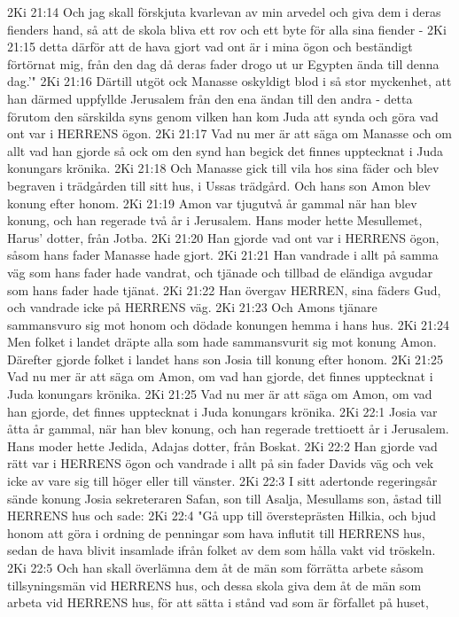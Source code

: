 2Ki 21:14  Och jag skall förskjuta kvarlevan av min arvedel och giva dem i deras fienders hand, så att de skola bliva ett rov och ett byte för alla sina fiender -
2Ki 21:15  detta därför att de hava gjort vad ont är i mina ögon och beständigt förtörnat mig, från den dag då deras fader drogo ut ur Egypten ända till denna dag.'"
2Ki 21:16  Därtill utgöt ock Manasse oskyldigt blod i så stor myckenhet, att han därmed uppfyllde Jerusalem från den ena ändan till den andra - detta förutom den särskilda syns genom vilken han kom Juda att synda och göra vad ont var i HERRENS ögon.
2Ki 21:17  Vad nu mer är att säga om Manasse och om allt vad han gjorde så ock om den synd han begick det finnes upptecknat i Juda konungars krönika.
2Ki 21:18  Och Manasse gick till vila hos sina fäder och blev begraven i trädgården till sitt hus, i Ussas trädgård. Och hans son Amon blev konung efter honom.
2Ki 21:19  Amon var tjugutvå år gammal när han blev konung, och han regerade två år i Jerusalem. Hans moder hette Mesullemet, Harus' dotter, från Jotba.
2Ki 21:20  Han gjorde vad ont var i HERRENS ögon, såsom hans fader Manasse hade gjort.
2Ki 21:21  Han vandrade i allt på samma väg som hans fader hade vandrat, och tjänade och tillbad de eländiga avgudar som hans fader hade tjänat.
2Ki 21:22  Han övergav HERREN, sina fäders Gud, och vandrade icke på HERRENS väg.
2Ki 21:23  Och Amons tjänare sammansvuro sig mot honom och dödade konungen hemma i hans hus.
2Ki 21:24  Men folket i landet dräpte alla som hade sammansvurit sig mot konung Amon. Därefter gjorde folket i landet hans son Josia till konung efter honom.
2Ki 21:25  Vad nu mer är att säga om Amon, om vad han gjorde, det finnes upptecknat i Juda konungars krönika.
2Ki 21:25  Vad nu mer är att säga om Amon, om vad han gjorde, det finnes upptecknat i Juda konungars krönika.
2Ki 22:1  Josia var åtta år gammal, när han blev konung, och han regerade trettioett år i Jerusalem. Hans moder hette Jedida, Adajas dotter, från Boskat.
2Ki 22:2  Han gjorde vad rätt var i HERRENS ögon och vandrade i allt på sin fader Davids väg och vek icke av vare sig till höger eller till vänster.
2Ki 22:3  I sitt adertonde regeringsår sände konung Josia sekreteraren Safan, son till Asalja, Mesullams son, åstad till HERRENS hus och sade:
2Ki 22:4  "Gå upp till översteprästen Hilkia, och bjud honom att göra i ordning de penningar som hava influtit till HERRENS hus, sedan de hava blivit insamlade ifrån folket av dem som hålla vakt vid tröskeln.
2Ki 22:5  Och han skall överlämna dem åt de män som förrätta arbete såsom tillsyningsmän vid HERRENS hus, och dessa skola giva dem åt de män som arbeta vid HERRENS hus, för att sätta i stånd vad som är förfallet på huset,
